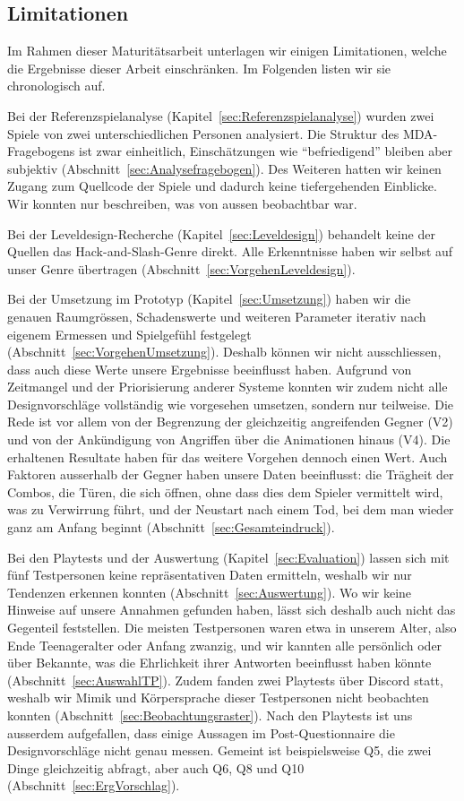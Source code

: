 \documentclass[../Main.tex]{subfiles}
\begin{document}
\subsection{Limitationen} \label{sec:Limitationen}

Im Rahmen dieser Maturitätsarbeit unterlagen wir einigen Limitationen, welche die Ergebnisse dieser Arbeit einschränken. Im Folgenden listen wir sie chronologisch auf.

Bei der Referenzspielanalyse (Kapitel~\ref{sec:Referenzspielanalyse}) wurden zwei Spiele von zwei unterschiedlichen Personen analysiert. Die Struktur des MDA-Fragebogens ist zwar einheitlich, Einschätzungen wie \enquote{befriedigend} bleiben aber subjektiv (Abschnitt~\ref{sec:Analysefragebogen}). Des Weiteren hatten wir keinen Zugang zum Quellcode der Spiele und dadurch keine tiefergehenden Einblicke. Wir konnten nur beschreiben, was von aussen beobachtbar war.

Bei der Leveldesign-Recherche (Kapitel~\ref{sec:Leveldesign}) behandelt keine der Quellen das Hack-and-Slash-Genre direkt. Alle Erkenntnisse haben wir selbst auf unser Genre übertragen (Abschnitt~\ref{sec:VorgehenLeveldesign}).

Bei der Umsetzung im Prototyp (Kapitel~\ref{sec:Umsetzung}) haben wir die genauen Raumgrössen, Schadenswerte und weiteren Parameter iterativ nach eigenem Ermessen und Spielgefühl festgelegt (Abschnitt~\ref{sec:VorgehenUmsetzung}). Deshalb können wir nicht ausschliessen, dass auch diese Werte unsere Ergebnisse beeinflusst haben. Aufgrund von Zeitmangel und der Priorisierung anderer Systeme konnten wir zudem nicht alle Designvorschläge vollständig wie vorgesehen umsetzen, sondern nur teilweise. Die Rede ist vor allem von der Begrenzung der gleichzeitig angreifenden Gegner (V2) und von der Ankündigung von Angriffen über die Animationen hinaus (V4). Die erhaltenen Resultate haben für das weitere Vorgehen dennoch einen Wert. Auch Faktoren ausserhalb der Gegner haben unsere Daten beeinflusst: die Trägheit der Combos, die Türen, die sich öffnen, ohne dass dies dem Spieler vermittelt wird, was zu Verwirrung führt, und der Neustart nach einem Tod, bei dem man wieder ganz am Anfang beginnt (Abschnitt~\ref{sec:Gesamteindruck}).

Bei den Playtests und der Auswertung (Kapitel~\ref{sec:Evaluation}) lassen sich mit fünf Testpersonen keine repräsentativen Daten ermitteln, weshalb wir nur Tendenzen erkennen konnten (Abschnitt~\ref{sec:Auswertung}). Wo wir keine Hinweise auf unsere Annahmen gefunden haben, lässt sich deshalb auch nicht das Gegenteil feststellen. Die meisten Testpersonen waren etwa in unserem Alter, also Ende Teenageralter oder Anfang zwanzig, und wir kannten alle persönlich oder über Bekannte, was die Ehrlichkeit ihrer Antworten beeinflusst haben könnte (Abschnitt~\ref{sec:AuswahlTP}). Zudem fanden zwei Playtests über Discord statt, weshalb wir Mimik und Körpersprache dieser Testpersonen nicht beobachten konnten (Abschnitt~\ref{sec:Beobachtungsraster}). Nach den Playtests ist uns ausserdem aufgefallen, dass einige Aussagen im Post-Questionnaire die Designvorschläge nicht genau messen. Gemeint ist beispielsweise Q5, die zwei Dinge gleichzeitig abfragt, aber auch Q6, Q8 und Q10 (Abschnitt~\ref{sec:ErgVorschlag}).
\end{document}
